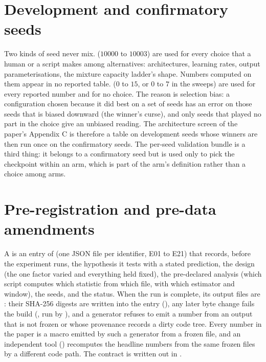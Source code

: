 \section{Development and confirmatory seeds}
\label{sec:seeds}

Two kinds of seed never mix.  ($10000$ to $10003$) are used for
every choice that a human or a script makes among alternatives: architectures,
learning rates, output parameterisations, the mixture capacity ladder's shape. Numbers
computed on them appear in no reported table.  ($0$ to $15$,
or $0$ to $7$ in the sweeps) are used for every reported number and for no choice.
The reason is selection bias: a configuration chosen because it did best on a set of
seeds has an error on those seeds that is biased downward (the winner's curse), and
only seeds that played no part in the choice give an unbiased reading. The
architecture screen of the paper's Appendix C is therefore a table on development
seeds whose winners are then run once on the confirmatory seeds. The per-seed
validation bundle is a third thing: it belongs to a confirmatory seed but is used only
to pick the checkpoint within an arm, which is part of the arm's definition rather
than a choice among arms.

\section{Pre-registration and pre-data amendments}
\label{sec:prereg}

A  is an entry of  (one JSON
file per identifier, E01 to E21) that records, before the experiment runs, the
hypothesis it tests with a stated prediction, the design (the one factor varied and
everything held fixed), the pre-declared analysis (which script computes which
statistic from which file, with which estimator and window), the seeds, and the
status. When the run is complete, its output files are : their SHA-256
digests are written into the entry (), any later byte change
fails the build (, run by ),
and a generator refuses to emit a number from an output that is not frozen or whose
provenance records a dirty code tree. Every number in the paper is a macro emitted by
such a generator from a frozen file, and an independent tool
() recomputes the headline numbers from the same frozen
files by a different code path. The contract is written out in
.


